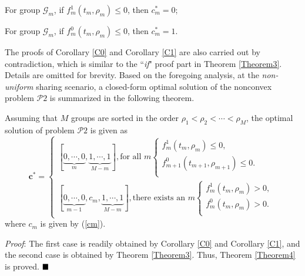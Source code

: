 \documentclass[12pt, draftclsnofoot, onecolumn]{IEEEtran}
\begin{document}
\begin{corollary}\label{C0}
For group $\mathcal{G}_m$, if $f^1_m(t_m, \rho_m)\leq 0$, then $c_m^{\ast}=0$;
\end{corollary}
\begin{corollary}\label{C1}
For group $\mathcal{G}_m$, if $f^0_m(t_m, \rho_m) \leq 0$, then $c_m^{\ast}=1$.
\end{corollary}
The proofs of Corollary \ref{C0} and Corollary \ref{C1} are also carried out by contradiction, which is similar to the ``\textit{if}" proof part in Theorem \ref{Theorem3}. Details are omitted for brevity.
Based on the foregoing analysis, at the \textit{non-uniform} sharing scenario, a closed-form optimal solution of the nonconvex problem $\mathcal{P}2$ is summarized in the following theorem.
\begin{theorem}\label{Theorem4}
Assuming that $M$ groups are sorted in the order $\rho_1 < \rho_2 <\cdots < \rho_M$, the optimal solution of problem $\mathcal{P}2$ is given as
\begin{equation}
\bm{c}^{\ast} =\left\{\begin{matrix}
[\underbrace{0,\cdots,0}_{m},\underbrace{1,\cdots,1}_{M-m}], \textrm{for all $m$}
\begin{cases}
 f^1_m(t_m, \rho_m)\leq 0, \\
 f^0_{m+1}(t_{m+1}, \rho_{m+1})\leq 0. \\
\end{cases}\\
[\underbrace{0,\cdots,0}_{m-1},c_m,\underbrace{1,\cdots,1}_{M-m}], \textrm{there exists an  $m$}
\begin{cases}
 f^1_m(t_m, \rho_m) > 0, \\
 f^0_m(t_m, \rho_m) > 0.\\
\end{cases}
\end{matrix}\right.
\end{equation}
where $c_m$ is given by (\ref{cm}).
\end{theorem}
\textit{Proof}: The first case is readily obtained by Corollary \ref{C0} and Corollary \ref{C1}, and the second case is obtained by Theorem \ref{Theorem3}. Thus, Theorem \ref{Theorem4} is proved.
$\hfill\blacksquare$
\end{document}
